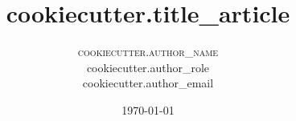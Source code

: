 \setlength{\droptitle}{-4\baselineskip} %

\pretitle{\begin{center}\Huge\bfseries} %
\posttitle{\end{center}} %
\title{
  {{cookiecutter.title_article}}
} %
\author{
\textsc{
	  {{cookiecutter.author_name}}
}\\[1ex] %
\normalsize {{cookiecutter.author_role}} \\
\normalsize {{cookiecutter.author_email}}
}

\date{\today} %

\renewcommand{\maketitlehookd}{
\begin{abstract}
	Lorem ipsum dolor sit amet, consectetur adipiscing elit. Proin cursus
	aliquam turpis, et vulputate arcu laoreet ac. Donec nec metus ornare leo
	tempor vehicula. Nam sit amet porttitor felis. Sed tristique ullamcorper
	imperdiet. Nulla rhoncus vestibulum dolor sit amet mattis. Donec nisi
	quam, venenatis vitae sem id, ullamcorper sollicitudin elit. Curabitur
	maximus velit tempus felis scelerisque, nec mattis est tincidunt.
	Pellentesque nec cursus quam. Ut in lacus vitae enim egestas dignissim.
\end{abstract}
}


